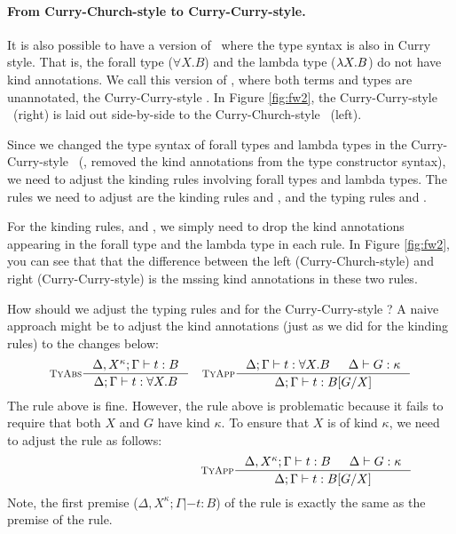 \paragraph{From Curry-Church-style to Curry-Curry-style.}
It is also possible to have a version of \Fw\ where the type syntax is also in Curry style.
That is, the forall type ($\forall X.B$) and the lambda type ($\lambda X.B$)
do not have kind annotations. We call this version of \Fw, where both terms
and types are unannotated, the Curry-Curry-style \Fw.
In Figure \ref{fig:fw2}, the Curry-Curry-style \Fw\ (right) is laid out
side-by-side to the Curry-Church-style \Fw\ (left).

Since we changed the type syntax of forall types and lambda types in
the Curry-Curry-style \Fw\ (\ie, removed the kind annotations from
the type constructor syntax), we need to adjust the kinding rules
involving forall types and lambda types. The rules we need to adjust are
the kinding rules  and , and
the typing rules  and .

For the kinding rules,  and , we simply need to
drop the kind annotations appearing in the forall type and
the lambda type in each rule. In Figure \ref{fig:fw2}, you can see that
that the difference between the left (Curry-Church-style) and
right (Curry-Curry-style) is the mssing kind annotations in these two rules.

How should we adjust the typing rules  and 
for the Curry-Curry-style \Fw? A naive approach might be to adjust
the kind annotations (just as we did for the kinding rules) to
the changes below:
\begin{align*}
& \inference[\sc TyAbs]{\Delta,X^\kappa;\Gamma |- t : B}
                       {\Delta;\Gamma |- t : \forall X.B}
& \inference[\sc TyApp]{\Delta;\Gamma |- t : \forall X.B & \Delta |- G:\kappa}
                       {\Delta;\Gamma |- t : B[G/X]}
\end{align*}
The  rule above is fine. However, the  rule
above is problematic because it fails to require that both $X$ and
$G$ have kind $\kappa$. To ensure that $X$ is of kind $\kappa$, we need to
adjust the  rule as follows:
\begin{align*}
& \phantom{ \inference[\sc TyAbs]{\Delta,X^\kappa;\Gamma |- t : B}
                                 {\Delta;\Gamma |- t : \forall X.B} }
& \inference[\sc TyApp]{\Delta,X^\kappa;\Gamma |- t : B & \Delta |- G:\kappa}
                        {\Delta;\Gamma |- t : B[G/X]}
\end{align*}
Note, the first premise ($\Delta,X^\kappa;\Gamma |- t : B$) of
the  rule is exactly the same as the premise of
the  rule.

